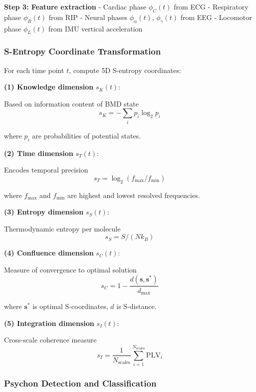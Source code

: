 \documentclass[11pt,onecolumn]{article}
\begin{document}
\textbf{Step 3: Feature extraction}
- Cardiac phase $\phi_C(t)$ from ECG
- Respiratory phase $\phi_R(t)$ from RIP
- Neural phases $\phi_\alpha(t)$, $\phi_\gamma(t)$ from EEG
- Locomotor phase $\phi_L(t)$ from IMU vertical acceleration

\subsubsection{S-Entropy Coordinate Transformation}

For each time point $t$, compute 5D S-entropy coordinates:

\textbf{(1) Knowledge dimension} $s_K(t)$:

Based on information content of BMD state
\begin{equation}
s_K = -\sum_i p_i \log_2 p_i
\end{equation}

where $p_i$ are probabilities of potential states.

\textbf{(2) Time dimension} $s_T(t)$:

Encodes temporal precision
\begin{equation}
s_T = \log_2(f_{\text{max}} / f_{\text{min}})
\end{equation}

where $f_{\text{max}}$ and $f_{\text{min}}$ are highest and lowest resolved frequencies.

\textbf{(3) Entropy dimension} $s_S(t)$:

Thermodynamic entropy per molecule
\begin{equation}
s_S = S / (N k_B)
\end{equation}

\textbf{(4) Confluence dimension} $s_C(t)$:

Measure of convergence to optimal solution
\begin{equation}
s_C = 1 - \frac{d(\mathbf{s}, \mathbf{s}^*)}{d_{\max}}
\end{equation}

where $\mathbf{s}^*$ is optimal S-coordinates, $d$ is S-distance.

\textbf{(5) Integration dimension} $s_I(t)$:

Cross-scale coherence measure
\begin{equation}
s_I = \frac{1}{N_{\text{scales}}}\sum_{i=1}^{N_{\text{scales}}} \text{PLV}_i
\end{equation}

\subsubsection{Psychon Detection and Classification}
\end{document}
